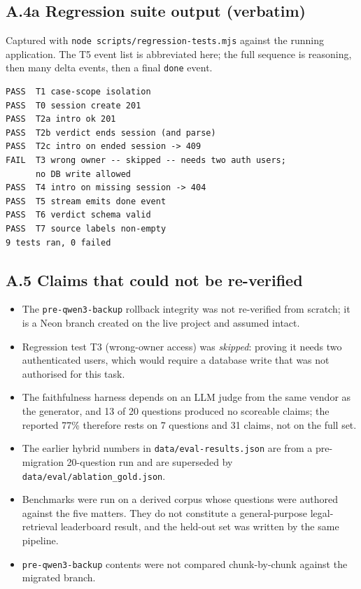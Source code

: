 \documentclass[12pt]{article}
\begin{document}
\subsection*{A.4a Regression suite output (verbatim)}
Captured with \texttt{node scripts/regression-tests.mjs} against the running application. The T5 event list is abbreviated here; the full sequence is reasoning, then many delta events, then a final \texttt{done} event.
{\footnotesize
\begin{verbatim}
PASS  T1 case-scope isolation
PASS  T0 session create 201
PASS  T2a intro ok 201
PASS  T2b verdict ends session (and parse)
PASS  T2c intro on ended session -> 409
FAIL  T3 wrong owner -- skipped -- needs two auth users;
      no DB write allowed
PASS  T4 intro on missing session -> 404
PASS  T5 stream emits done event
PASS  T6 verdict schema valid
PASS  T7 source labels non-empty
9 tests ran, 0 failed
\end{verbatim}
}

\subsection*{A.5 Claims that could not be re-verified}
\begin{itemize}
\item The \texttt{pre-qwen3-backup} rollback integrity was not re-verified from scratch; it is a Neon branch created on the live project and assumed intact.
\item Regression test T3 (wrong-owner access) was \emph{skipped}: proving it needs two authenticated users, which would require a database write that was not authorised for this task.
\item The faithfulness harness depends on an LLM judge from the same vendor as the generator, and 13 of 20 questions produced no scoreable claims; the reported 77\% therefore rests on 7 questions and 31 claims, not on the full set.
\item The earlier hybrid numbers in \texttt{data/eval-results.json} are from a pre-migration 20-question run and are superseded by \texttt{data/eval/ablation\_gold.json}.
\item Benchmarks were run on a derived corpus whose questions were authored against the five matters. They do not constitute a general-purpose legal-retrieval leaderboard result, and the held-out set was written by the same pipeline.
\item \texttt{pre-qwen3-backup} contents were not compared chunk-by-chunk against the migrated branch.
\end{itemize}
\end{document}

